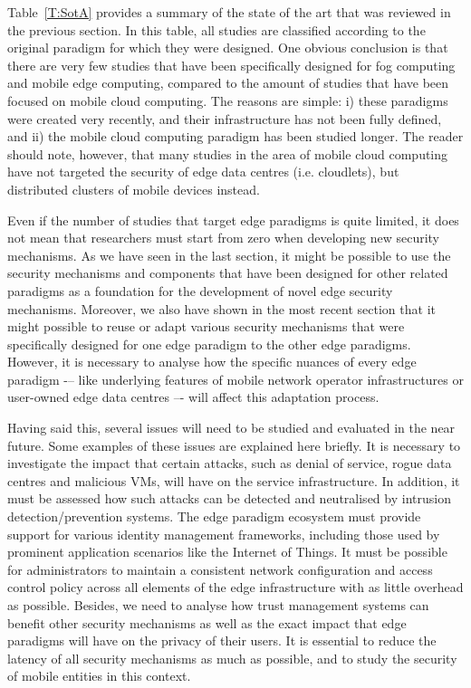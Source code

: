 \documentclass[twocolumn,preprint,3p]{elsarticle}
\begin{document}
Table~\ref{T:SotA} provides a summary of the state of the art that was reviewed in the previous section. In this table, all studies are classified according to the original paradigm for which they were designed. One obvious conclusion is that there are very few studies that have been specifically designed for fog computing and mobile edge computing, compared to the amount of studies that have been focused on mobile cloud computing. The reasons are simple: i) these paradigms were created very recently, and their infrastructure has not been fully defined, and ii) the mobile cloud computing paradigm has been studied longer. The reader should note, however, that many studies in the area of mobile cloud computing have not targeted the security of edge data centres (i.e. cloudlets), but distributed clusters of mobile devices instead.

Even if the number of studies that target edge paradigms is quite limited, it does not mean that researchers must start from zero when developing new security mechanisms. As we have seen in the last section, it might be possible to use the security mechanisms and components that have been designed for other related paradigms as a foundation for the development of novel edge security mechanisms. Moreover, we also have shown in the most recent section that it might possible to reuse or adapt various security mechanisms that were specifically designed for one edge paradigm to the other edge paradigms. However, it is necessary to analyse how the specific nuances of every edge paradigm -– like underlying features of mobile network operator infrastructures or user-owned edge data centres –- will affect this adaptation process.

Having said this, several issues will need to be studied and evaluated in the near future. Some examples of these issues are explained here briefly. It is necessary to investigate the impact that certain attacks, such as denial of service, rogue data centres and malicious VMs, will have on the service infrastructure. In addition, it must be assessed how such attacks can be detected and neutralised by intrusion detection/prevention systems. The edge paradigm ecosystem must provide support for various identity management frameworks, including those used by prominent application scenarios like the Internet of Things. It must be possible for administrators to maintain a consistent network configuration and access control policy across all elements of the edge infrastructure with as little overhead as possible. Besides, we need to analyse how trust management systems can benefit other security mechanisms as well as the exact impact that edge paradigms will have on the privacy of their users. It is essential to reduce the latency of all security mechanisms as much as possible, and to study the security of mobile entities in this context.
\end{document}
